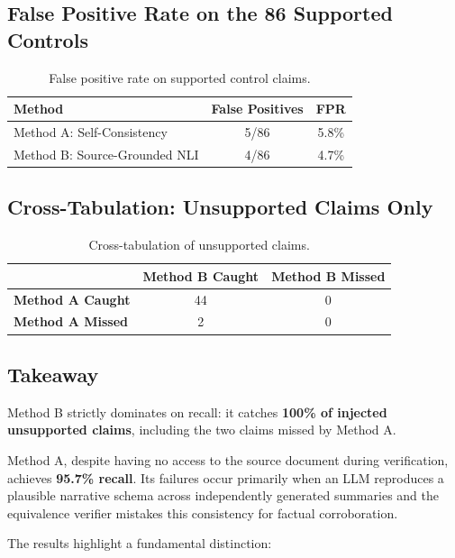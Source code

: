 \documentclass[11pt,a4paper]{article}
\begin{document}
\subsection{False Positive Rate on the 86 Supported Controls}

\begin{table}[h]
\centering
\begin{tabular}{lcc}
\toprule
\textbf{Method} & \textbf{False Positives} & \textbf{FPR} \\
\midrule
Method A: Self-Consistency & 5/86 & 5.8\% \\
Method B: Source-Grounded NLI & 4/86 & 4.7\% \\
\bottomrule
\end{tabular}
\caption{False positive rate on supported control claims.}
\end{table}

\subsection{Cross-Tabulation: Unsupported Claims Only}

\begin{table}[h]
\centering
\begin{tabular}{lcc}
\toprule
 & \textbf{Method B Caught} & \textbf{Method B Missed} \\
\midrule
\textbf{Method A Caught} & 44 & 0 \\
\textbf{Method A Missed} & 2 & 0 \\
\bottomrule
\end{tabular}
\caption{Cross-tabulation of unsupported claims.}
\end{table}

\subsection{Takeaway}

Method B strictly dominates on recall: it catches \textbf{100\% of injected unsupported claims}, including the two claims missed by Method A.

Method A, despite having no access to the source document during verification, achieves \textbf{95.7\% recall}. Its failures occur primarily when an LLM reproduces a plausible narrative schema across independently generated summaries and the equivalence verifier mistakes this consistency for factual corroboration.

The results highlight a fundamental distinction:
\end{document}
